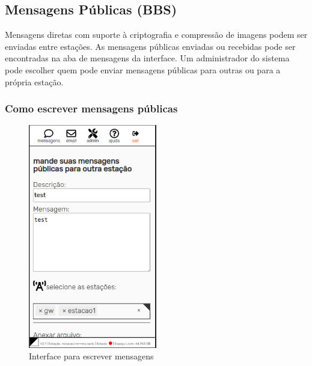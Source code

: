 \documentclass[11pt,a4paper]{article}
\begin{document}
\subsection{Mensagens Públicas  (BBS)}

Mensagens diretas com suporte à criptografia e compressão de imagens podem ser enviadas entre estações. As mensagens públicas enviadas ou recebidas pode ser encontradas na aba de mensagens da interface. Um administrador do sistema pode escolher quem pode enviar mensagens públicas para outras ou para a própria estação.

\subsubsection{Como escrever mensagens públicas}


\begin{figure}[H]
    \centering
    \includegraphics[width=0.5\textwidth]{screenshots/frontend/pt_kn/publicas.png}
    \caption{Interface para escrever mensagens}
    \label{fig:compose}
\end{figure}
\end{document}

